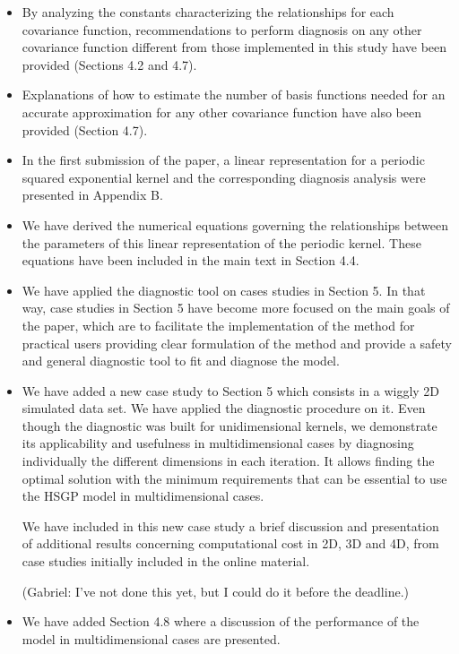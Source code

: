 \documentclass[11pt]{report}
\begin{document}
\begin{itemize}
\item By analyzing the constants characterizing the relationships for each covariance function, recommendations to perform diagnosis on any other covariance function different from those implemented in this study have been provided (Sections 4.2 and 4.7).

\item Explanations of how to estimate the number of basis functions needed for an accurate approximation for any other covariance function have also been provided (Section 4.7).

\item In the first submission of the paper, a linear representation for a periodic squared exponential kernel and the corresponding diagnosis analysis were presented in Appendix B. 

\item We have derived the numerical equations governing the relationships between the parameters of this linear representation of the periodic kernel. These equations have been included in the main text in Section 4.4.

\item We have applied the diagnostic tool on cases studies in Section 5. In that way, case studies in Section 5 have become more focused on the main goals of the paper, which are to facilitate the implementation of the method for practical users providing clear formulation of the method and provide a safety and general diagnostic tool to fit and diagnose the model.

\item We have added a new case study to Section 5 which consists in a wiggly 2D simulated data set. We have applied the diagnostic procedure on it. Even though the diagnostic was built for unidimensional kernels, we demonstrate its applicability and usefulness in multidimensional cases by diagnosing individually the different dimensions in each iteration. It allows finding the  optimal solution with the minimum requirements that can be essential to use the HSGP model in multidimensional cases.

We have included in this new case study a brief discussion and presentation of additional results concerning computational cost in 2D, 3D and 4D, from case studies initially included in the online material.

{\color{blue} (Gabriel: I've not done this yet, but I could do it before the deadline.)}

\item We have added Section 4.8 where a discussion of the performance of the model in multidimensional cases are presented. 


\end{itemize}
\end{document}
